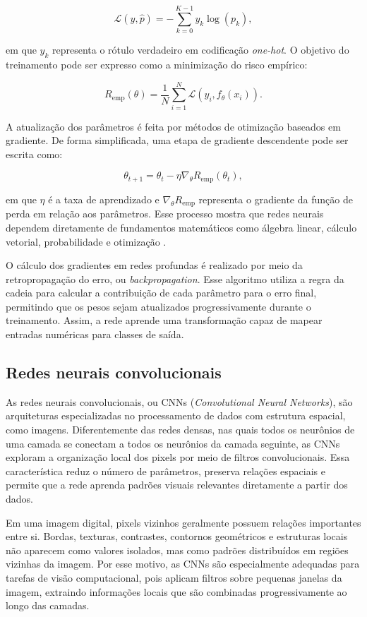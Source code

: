 \documentclass[
    12pt,
    openright,
    oneside,
    a4paper,
    english,
    brazil
]{abntex2}
\begin{document}
\[
\mathcal{L}(y,\hat{p}) =
-\sum_{k=0}^{K-1} y_k \log(p_k),
\]

em que \(y_k\) representa o rótulo verdadeiro em codificação \textit{one-hot}. O objetivo do treinamento pode ser expresso como a minimização do risco empírico:

\[
R_{\text{emp}}(\theta) =
\frac{1}{N}
\sum_{i=1}^{N}
\mathcal{L}(y_i, f_{\theta}(x_i)).
\]

A atualização dos parâmetros é feita por métodos de otimização baseados em gradiente. De forma simplificada, uma etapa de gradiente descendente pode ser escrita como:

\[
\theta_{t+1}
=
\theta_t
-
\eta \nabla_{\theta}R_{\text{emp}}(\theta_t),
\]

em que \(\eta\) é a taxa de aprendizado e \(\nabla_{\theta}R_{\text{emp}}\) representa o gradiente da função de perda em relação aos parâmetros. Esse processo mostra que redes neurais dependem diretamente de fundamentos matemáticos como álgebra linear, cálculo vetorial, probabilidade e otimização \cite{deisenroth2020mathematics}.

O cálculo dos gradientes em redes profundas é realizado por meio da retropropagação do erro, ou \textit{backpropagation}. Esse algoritmo utiliza a regra da cadeia para calcular a contribuição de cada parâmetro para o erro final, permitindo que os pesos sejam atualizados progressivamente durante o treinamento. Assim, a rede aprende uma transformação capaz de mapear entradas numéricas para classes de saída.

\subsection{Redes neurais convolucionais}
\label{subsec:redes_neurais_convolucionais}

As redes neurais convolucionais, ou CNNs (\textit{Convolutional Neural Networks}), são arquiteturas especializadas no processamento de dados com estrutura espacial, como imagens. Diferentemente das redes densas, nas quais todos os neurônios de uma camada se conectam a todos os neurônios da camada seguinte, as CNNs exploram a organização local dos pixels por meio de filtros convolucionais. Essa característica reduz o número de parâmetros, preserva relações espaciais e permite que a rede aprenda padrões visuais relevantes diretamente a partir dos dados.

Em uma imagem digital, pixels vizinhos geralmente possuem relações importantes entre si. Bordas, texturas, contrastes, contornos geométricos e estruturas locais não aparecem como valores isolados, mas como padrões distribuídos em regiões vizinhas da imagem. Por esse motivo, as CNNs são especialmente adequadas para tarefas de visão computacional, pois aplicam filtros sobre pequenas janelas da imagem, extraindo informações locais que são combinadas progressivamente ao longo das camadas.
\end{document}
